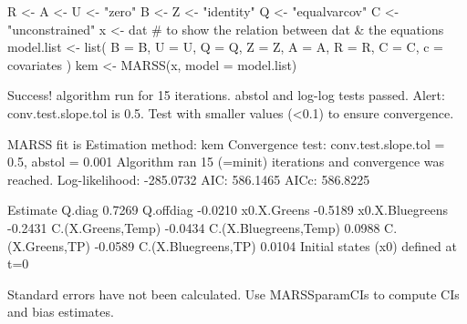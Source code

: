 \begin{Schunk}
\begin{Sinput}
 R <- A <- U <- "zero"
 B <- Z <- "identity"
 Q <- "equalvarcov"
 C <- "unconstrained"
 x <- dat # to show the relation between dat & the equations
 model.list <- list(
   B = B, U = U, Q = Q, Z = Z, A = A,
   R = R, C = C, c = covariates
 )
 kem <- MARSS(x, model = model.list)
\end{Sinput}
\begin{Soutput}
Success! algorithm run for 15 iterations. abstol and log-log tests passed.
Alert: conv.test.slope.tol is 0.5.
Test with smaller values (<0.1) to ensure convergence.

MARSS fit is
Estimation method: kem 
Convergence test: conv.test.slope.tol = 0.5, abstol = 0.001
Algorithm ran 15 (=minit) iterations and convergence was reached. 
Log-likelihood: -285.0732 
AIC: 586.1465   AICc: 586.8225   
 
                      Estimate
Q.diag                  0.7269
Q.offdiag              -0.0210
x0.X.Greens            -0.5189
x0.X.Bluegreens        -0.2431
C.(X.Greens,Temp)      -0.0434
C.(X.Bluegreens,Temp)   0.0988
C.(X.Greens,TP)        -0.0589
C.(X.Bluegreens,TP)     0.0104
Initial states (x0) defined at t=0

Standard errors have not been calculated. 
Use MARSSparamCIs to compute CIs and bias estimates.
\end{Soutput}
\end{Schunk}
